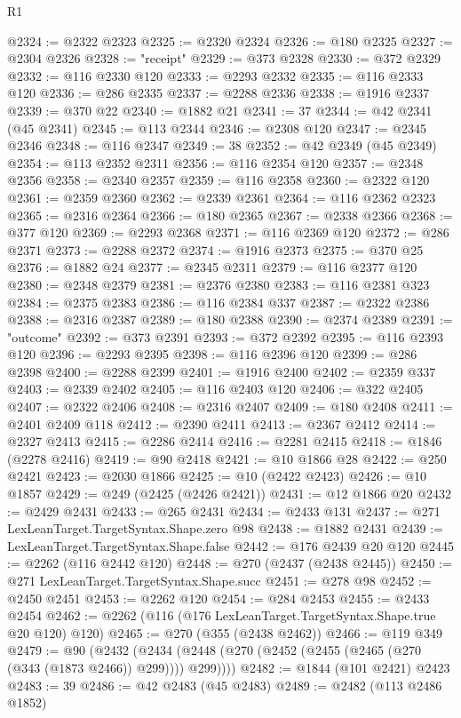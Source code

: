 \begin{lexlean}{R1}
\begin{coremodule}
@2324 := @2322 @2323
@2325 := @2320 @2324
@2326 := @180 @2325
@2327 := @2304 @2326
@2328 := "receipt"
@2329 := @373 @2328
@2330 := @372 @2329
@2332 := @116 @2330 @120
@2333 := @2293 @2332
@2335 := @116 @2333 @120
@2336 := @286 @2335
@2337 := @2288 @2336
@2338 := @1916 @2337
@2339 := @370 @22
@2340 := @1882 @21
@2341 := 37
@2344 := @42 @2341 (@45 @2341)
@2345 := @113 @2344
@2346 := @2308 @120
@2347 := @2345 @2346
@2348 := @116 @2347
@2349 := 38
@2352 := @42 @2349 (@45 @2349)
@2354 := @113 @2352 @2311
@2356 := @116 @2354 @120
@2357 := @2348 @2356
@2358 := @2340 @2357
@2359 := @116 @2358
@2360 := @2322 @120
@2361 := @2359 @2360
@2362 := @2339 @2361
@2364 := @116 @2362 @2323
@2365 := @2316 @2364
@2366 := @180 @2365
@2367 := @2338 @2366
@2368 := @377 @120
@2369 := @2293 @2368
@2371 := @116 @2369 @120
@2372 := @286 @2371
@2373 := @2288 @2372
@2374 := @1916 @2373
@2375 := @370 @25
@2376 := @1882 @24
@2377 := @2345 @2311
@2379 := @116 @2377 @120
@2380 := @2348 @2379
@2381 := @2376 @2380
@2383 := @116 @2381 @323
@2384 := @2375 @2383
@2386 := @116 @2384 @337
@2387 := @2322 @2386
@2388 := @2316 @2387
@2389 := @180 @2388
@2390 := @2374 @2389
@2391 := "outcome"
@2392 := @373 @2391
@2393 := @372 @2392
@2395 := @116 @2393 @120
@2396 := @2293 @2395
@2398 := @116 @2396 @120
@2399 := @286 @2398
@2400 := @2288 @2399
@2401 := @1916 @2400
@2402 := @2359 @337
@2403 := @2339 @2402
@2405 := @116 @2403 @120
@2406 := @322 @2405
@2407 := @2322 @2406
@2408 := @2316 @2407
@2409 := @180 @2408
@2411 := @2401 @2409 @118
@2412 := @2390 @2411
@2413 := @2367 @2412
@2414 := @2327 @2413
@2415 := @2286 @2414
@2416 := @2281 @2415
@2418 := @1846 (@2278 @2416)
@2419 := @90 @2418
@2421 := @10 @1866 @28
@2422 := @250 @2421
@2423 := @2030 @1866
@2425 := @10 (@2422 @2423)
@2426 := @10 @1857
@2429 := @249 (@2425 (@2426 @2421))
@2431 := @12 @1866 @20
@2432 := @2429 @2431
@2433 := @265 @2431
@2434 := @2433 @131
@2437 := @271 LexLeanTarget.TargetSyntax.Shape.zero @98
@2438 := @1882 @2431
@2439 := LexLeanTarget.TargetSyntax.Shape.false
@2442 := @176 @2439 @20 @120
@2445 := @2262 (@116 @2442 @120)
@2448 := @270 (@2437 (@2438 @2445))
@2450 := @271 LexLeanTarget.TargetSyntax.Shape.succ
@2451 := @278 @98
@2452 := @2450 @2451
@2453 := @2262 @120
@2454 := @284 @2453
@2455 := @2433 @2454
@2462 := @2262 (@116 (@176 LexLeanTarget.TargetSyntax.Shape.true @20 @120) @120)
@2465 := @270 (@355 (@2438 @2462))
@2466 := @119 @349
@2479 := @90
    (@2432 (@2434 (@2448 (@270 (@2452 (@2455 (@2465 (@270 (@343 (@1873 @2466)) @299)))) @299))))
@2482 := @1844 (@101 @2421) @2423
@2483 := 39
@2486 := @42 @2483 (@45 @2483)
@2489 := @2482 (@113 @2486 @1852)

\end{coremodule}
\end{lexlean}

